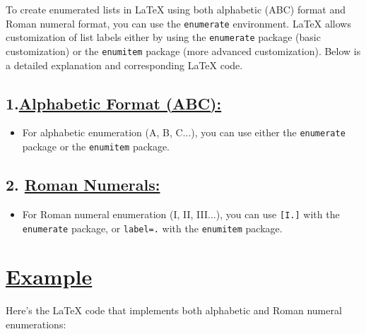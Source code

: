 \documentclass{article}
\begin{document}
\large{To create enumerated lists in LaTeX using both alphabetic (ABC) format and Roman numeral format, you can use the \texttt{enumerate} environment. LaTeX allows customization of list labels either by using the \texttt{enumerate} package (basic customization) or the \texttt{enumitem} package (more advanced customization). Below is a detailed explanation and corresponding LaTeX code.}

\subsection*{1.\underline{Alphabetic Format (ABC):}}
\begin{itemize}
    \item For alphabetic enumeration (A, B, C...), you can use either the \texttt{enumerate} package or the \texttt{enumitem} package.
  \end{itemize}

\subsection*{2. \underline{Roman Numerals:}}
\begin{itemize}
    \item For Roman numeral enumeration (I, II, III...), you can use \texttt{[I.]} with the \texttt{enumerate} package, or \texttt{label=\Roman*.} with the \texttt{enumitem} package.
\end{itemize}

\section*{\underline{Example}}

Here’s the LaTeX code that implements both alphabetic and Roman numeral enumerations:
\end{document}
